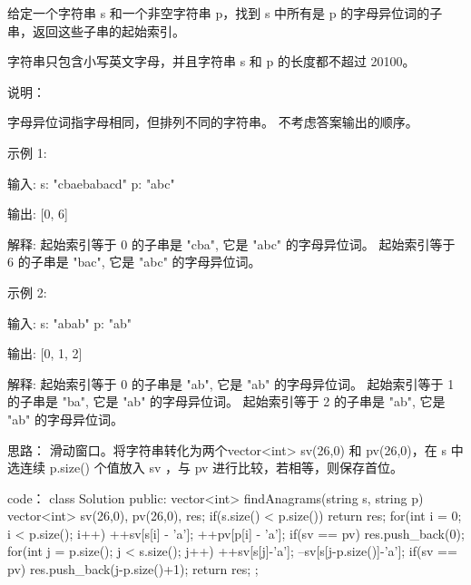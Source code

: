给定一个字符串 s 和一个非空字符串 p，找到 s 中所有是 p 的字母异位词的子串，返回这些子串的起始索引。

字符串只包含小写英文字母，并且字符串 s 和 p 的长度都不超过 20100。

说明：

    字母异位词指字母相同，但排列不同的字符串。
    不考虑答案输出的顺序。

示例 1:

输入:
s: "cbaebabacd" p: "abc"

输出:
[0, 6]

解释:
起始索引等于 0 的子串是 "cba", 它是 "abc" 的字母异位词。
起始索引等于 6 的子串是 "bac", 它是 "abc" 的字母异位词。

 示例 2:

输入:
s: "abab" p: "ab"

输出:
[0, 1, 2]

解释:
起始索引等于 0 的子串是 "ab", 它是 "ab" 的字母异位词。
起始索引等于 1 的子串是 "ba", 它是 "ab" 的字母异位词。
起始索引等于 2 的子串是 "ab", 它是 "ab" 的字母异位词。
































思路：
滑动窗口。将字符串转化为两个vector<int> sv(26,0) 和 pv(26,0)，在 s 中选连续 p.size() 个值放入 sv ，与 pv 进行比较，若相等，则保存首位。



















code：
class Solution {
public:
    vector<int> findAnagrams(string s, string p) {
        vector<int> sv(26,0), pv(26,0), res;
        if(s.size() < p.size()) return res;
        for(int i = 0; i < p.size(); i++)
        {
            ++sv[s[i] - 'a'];
            ++pv[p[i] - 'a'];
        }
        if(sv == pv) res.push_back(0);
        for(int j = p.size(); j < s.size(); j++)
        {
            ++sv[s[j]-'a'];
            --sv[s[j-p.size()]-'a'];
            if(sv == pv) res.push_back(j-p.size()+1);
        }
        return res;
    }
};